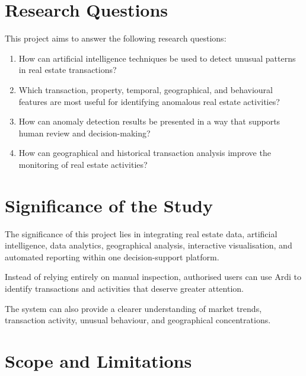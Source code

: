 \documentclass[12pt,a4paper,oneside]{report}
\begin{document}
\section{Research Questions}

This project aims to answer the following research questions:

\begin{enumerate}

    \item How can artificial intelligence techniques be used to
    detect unusual patterns in real estate transactions?

    \item Which transaction, property, temporal, geographical, and
    behavioural features are most useful for identifying anomalous
    real estate activities?

    \item How can anomaly detection results be presented in a way
    that supports human review and decision-making?

    \item How can geographical and historical transaction analysis
    improve the monitoring of real estate activities?

\end{enumerate}

\section{Significance of the Study}

The significance of this project lies in integrating real estate data,
artificial intelligence, data analytics, geographical analysis,
interactive visualisation, and automated reporting within one
decision-support platform.

Instead of relying entirely on manual inspection, authorised users can
use Ardi to identify transactions and activities that deserve greater
attention.

The system can also provide a clearer understanding of market trends,
transaction activity, unusual behaviour, and geographical
concentrations.

\section{Scope and Limitations}
\end{document}
